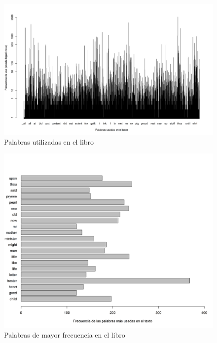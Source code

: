 \documentclass[fontsize=12pt]{article}
\begin{document}
\begin{figure}
\centering
\includegraphics[scale=0.5]{Figures/palabrasEnElTexto.png}
\caption{Palabras utilizadas en el libro}
\label{palabras}
\end{figure}

\begin{figure}
\centering
\includegraphics[scale=0.6]{Figures/palabrasFiltradas.png}
\caption{Palabras de mayor frecuencia en el libro}
\label{palabrasfiltradas}
\end{figure}
\end{document}
